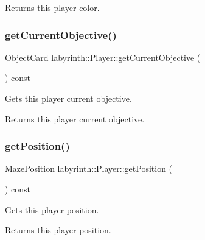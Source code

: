 \begin{DoxyReturn}{Returns}
this player color. 
\end{DoxyReturn}
\mbox{\label{structlabyrinth_1_1_player_a112a9f469e58c6fff3ab6b8b16bc89a4}} 
\subsubsection{\texorpdfstring{getCurrentObjective()}{getCurrentObjective()}}
{\footnotesize\ttfamily \mbox{\hyperlink{structlabyrinth_1_1_object_card}{Object\+Card}} labyrinth\+::\+Player\+::get\+Current\+Objective (\begin{DoxyParamCaption}{ }\end{DoxyParamCaption}) const}



Gets this player current objective. 

\begin{DoxyReturn}{Returns}
this player current objective. 
\end{DoxyReturn}
\mbox{\label{structlabyrinth_1_1_player_a5c137813c71681bbcc2f7423dc7340a1}} 
\subsubsection{\texorpdfstring{getPosition()}{getPosition()}}
{\footnotesize\ttfamily Maze\+Position labyrinth\+::\+Player\+::get\+Position (\begin{DoxyParamCaption}{ }\end{DoxyParamCaption}) const}



Gets this player position. 

\begin{DoxyReturn}{Returns}
this player position. 
\end{DoxyReturn}
\mbox{\label{structlabyrinth_1_1_player_a25f97e3973de17d8a72dfbd136126a96}} 
